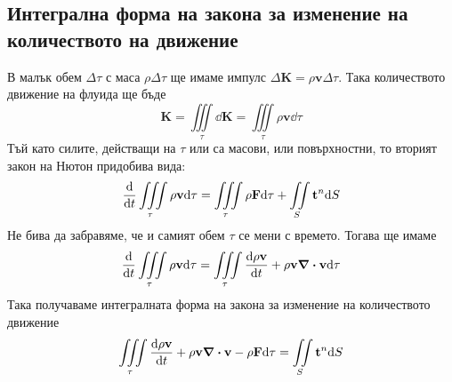 \documentclass[bulgarian, 12pt]{article}
\begin{document}
\subsection{Интегрална форма на закона за изменение на количеството на движение}
В малък обем $\Delta \tau$ с маса $\rho \Delta \tau$ ще имаме импулс $\Delta \mathbf{K} = \rho \mathbf{v} \Delta \tau$.
Така количеството движение на флуида ще бъде
\begin{equation}
	\mathbf{K} = \iiint\limits_{\tau} \dd \mathbf{K} = \iiint\limits_{\tau} \rho \mathbf{v} \dd \tau
\end{equation}
Тъй като силите, действащи на $\tau$ или са масови, или повърхностни, то вторият закон на Нютон придобива вида:
\begin{equation}
	\dv{t}\iiint\limits_{\tau} \rho \mathbf{v} \dd \tau = \iiint\limits_{\tau} \rho \mathbf{F} \dd \tau + \iint\limits_{S} \mathbf{t}^n \dd S
\end{equation}
Не бива да забравяме, че и самият обем $\tau$ се мени с времето. Тогава ще имаме 
\begin{equation}
	\dv{t}\iiint\limits_{\tau} \rho \mathbf{v} \dd \tau = \iiint\limits_{\tau} \dv{\rho \mathbf{v}}{t} + \rho \mathbf{v} \div \mathbf{v} \dd \tau 
\end{equation}
Така получаваме интегралната форма на закона за изменение на количеството движение
\begin{equation}
	\iiint\limits_{\tau} \dv{\rho \mathbf{v}}{t} + \rho \mathbf{v} \div \mathbf{v} - \rho \mathbf{F} \dd \tau = \iint\limits_{S} \mathbf{t}^n \dd S
\end{equation}
\end{document}
